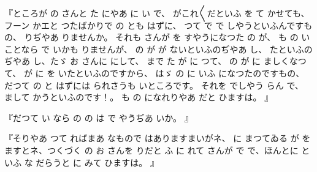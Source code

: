 
『ところが
の
さんと
た
にやあ
に
い
で、
がこれ〳〵だといふ
を
て
かせても、フーン
かエと
つたばかりで
の
とも
はずに、
つて
で
で
しやうといふんですもの、
りぢやあ
りませんか。
それも
さんが
を
すやうになつた
の
が、
も
の
いことなら
で
いかも
りませんが、
の
が
が
ないといふのぢやあ
し、
たといふのぢやあ
し、たゞ
お
さんに
にして、
まで
た
が
に
つて、
の
が
に
ましくなつて、
が
に
を
いたといふのですから、
はゞ
の
に
いふ
になつたのですもの、
だつて
の
と
はずには
られさうも
いところです。
それを
でしやう
らん
で、
まして
かうといふのです！。
も
の
になれりやあ
だと
ひますは。
』

『だつて
い
なら
の
の
は
で
やうぢあ
いか。
』

『そりやあ
つて
ればまあ
なもので
はありますまいがネ、
に
まつてゐる
が
を
ますとネ、つくづく
の
お
さんを
りだと
ふ
に
れて
さんが
で
で、ほんとに
といふ
な
だらうと
に
みて
ひますは。
』

